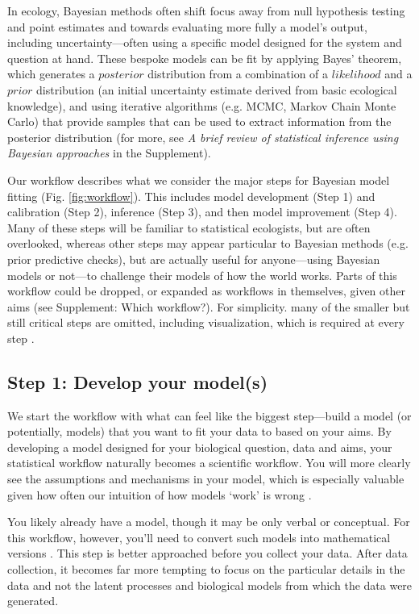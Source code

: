 \documentclass[11pt]{article}
\begin{document}
In ecology, Bayesian methods often shift focus away from null hypothesis testing and point estimates and towards evaluating more fully a model's output, including uncertainty---often using a specific model designed for the system and question at hand. These bespoke models can be fit by applying Bayes' theorem, which generates a $posterior$ distribution from a combination of a $likelihood$ and a $prior$ distribution (an initial uncertainty estimate derived from basic ecological knowledge), and using iterative algorithms (e.g. MCMC, Markov Chain Monte Carlo) that provide samples that can be used to extract information from the posterior distribution (for more, see \emph{A brief review of statistical inference using Bayesian approaches} in the Supplement).

Our workflow describes what we consider the major steps for Bayesian model fitting (Fig. \ref{fig:workflow}). This includes model development (Step 1) and calibration (Step 2), inference (Step 3), and then model improvement (Step 4). Many of these steps will be familiar to statistical ecologists, but are often overlooked, whereas other steps may appear particular to Bayesian methods (e.g. prior predictive checks), but are actually useful for anyone---using Bayesian models or not---to challenge their models of how the world works. Parts of this workflow could be dropped, or expanded as workflows in themselves, given other aims (see Supplement: Which workflow?). For simplicity. many of the smaller but still critical steps are omitted, including visualization, which is required at every step \citep[and for which there are many good resources, e.g.][]{gabryvis}. 

\subsection*{Step 1: Develop your model(s)} 

We start the workflow with what can feel like the biggest step---build a model (or potentially, models) that you want to fit your data to based on your aims. By developing a model designed for your biological question, data and aims, your statistical workflow naturally becomes a scientific workflow. You will more clearly see the assumptions and mechanisms in your model, which is especially valuable given how often our intuition of how models `work' is wrong \citep{kokko2005useful}.  

You likely already have a model, though it may be only verbal or conceptual. For this workflow, however, you’ll need to convert such models into mathematical versions \citep{servedio2014not}. This step is better approached before you collect your data. After data collection, it becomes far more tempting to focus on the particular details in the data and not the latent processes and biological models from which the data were generated. 
\end{document}
